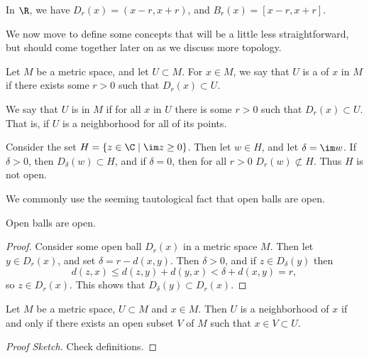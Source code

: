 \begin{example}
    In $\R$, we have $D_r(x) = (x - r, x + r)$, and $B_r(x) = [x - r, x + r]$.
\end{example}

We now move to define some concepts that will be a little less straightforward, but should come together later on as we discuss more topology.

\begin{definition}[Neighborhood]
    Let $M$ be a metric space, and let $U \subset M$. For $x \in M$, we say that $U$ is a  of $x$ in $M$ if there exists some $r > 0$ such that $D_r(x) \subset U$.
\end{definition}
\begin{definition}[Open]
    We say that $U$ is  in $M$ if for all $x$ in $U$ there is some $r > 0$ such that $D_r(x) \subset U$. That is, if $U$ is a neighborhood for all of its points.
\end{definition}

\begin{example}
    Consider the set $H = \{z \in \C \mid \im z \geq 0 \}$.
    Then let $w \in H$, and let $\delta = \im w$. If $\delta > 0$, then $D_{\delta}(w) \subset H$, and if $\delta = 0$, then for all $r > 0$ $D_r(w) \not \subset H$. Thus $H$ is not open.
\end{example}

We commonly use the seeming tautological fact that open balls are open.

\begin{lemma}
    Open balls are open.
\end{lemma}
\begin{proof}
    Consider some open ball $D_r(x)$ in a metric space $M$. Then let $y \in D_r(x)$, and set $\delta = r - d(x, y)$. Then $\delta >0$, and if $z \in D_{\delta}(y)$ then
    $$
    d(z, x) \leq d(z, y) + d(y, x) < \delta + d(x, y) = r,
    $$
    so $z \in D_r(x)$. This shows that $D_{\delta}(y) \subset D_r(x)$.
\end{proof}

\begin{corollary}
    Let $M$ be a metric space, $U \subset M$ and $x \in M$. Then $U$ is a neighborhood of $x$ if and only if there exists an open subset $V$ of $M$ such that $x \in V \subset U$.
\end{corollary}
\begin{proof}[Proof Sketch]
    Check definitions.
\end{proof}

